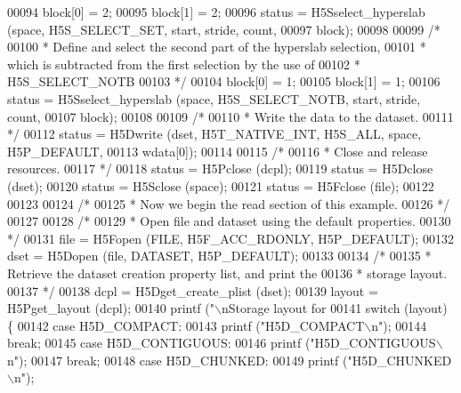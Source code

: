 \begin{DoxyCode}
{00094     block[0] = 2;
00095     block[1] = 2;
00096     status = H5Sselect\_hyperslab (space, H5S\_SELECT\_SET, start, stride, count,
00097                 block);
00098 
00099     \textcolor{comment}{/*}
00100 \textcolor{comment}{     * Define and select the second part of the hyperslab selection,}
00101 \textcolor{comment}{     * which is subtracted from the first selection by the use of}
00102 \textcolor{comment}{     * H5S\_SELECT\_NOTB}
00103 \textcolor{comment}{     */}
00104     block[0] = 1;
00105     block[1] = 1;
00106     status = H5Sselect\_hyperslab (space, H5S\_SELECT\_NOTB, start, stride, count,
00107                 block);
00108 
00109     \textcolor{comment}{/*}
00110 \textcolor{comment}{     * Write the data to the dataset.}
00111 \textcolor{comment}{     */}
00112     status = H5Dwrite (dset, H5T\_NATIVE\_INT, H5S\_ALL, space, H5P\_DEFAULT,
00113                 wdata[0]);
00114 
00115     \textcolor{comment}{/*}
00116 \textcolor{comment}{     * Close and release resources.}
00117 \textcolor{comment}{     */}
00118     status = H5Pclose (dcpl);
00119     status = H5Dclose (dset);
00120     status = H5Sclose (space);
00121     status = H5Fclose (file);
00122 
00123 
00124     \textcolor{comment}{/*}
00125 \textcolor{comment}{     * Now we begin the read section of this example.}
00126 \textcolor{comment}{     */}
00127 
00128     \textcolor{comment}{/*}
00129 \textcolor{comment}{     * Open file and dataset using the default properties.}
00130 \textcolor{comment}{     */}
00131     file = H5Fopen (FILE, H5F\_ACC\_RDONLY, H5P\_DEFAULT);
00132     dset = H5Dopen (file, DATASET, H5P\_DEFAULT);
00133 
00134     \textcolor{comment}{/*}
00135 \textcolor{comment}{     * Retrieve the dataset creation property list, and print the}
00136 \textcolor{comment}{     * storage layout.}
00137 \textcolor{comment}{     */}
00138     dcpl = H5Dget\_create\_plist (dset);
00139     layout = H5Pget\_layout (dcpl);
00140     printf (\textcolor{stringliteral}{"\(\backslash\)nStorage layout for %
00141     \textcolor{keywordflow}{switch} (layout) \{
00142         \textcolor{keywordflow}{case} H5D\_COMPACT:
00143             printf (\textcolor{stringliteral}{"H5D\_COMPACT\(\backslash\)n"});
00144             \textcolor{keywordflow}{break};
00145         \textcolor{keywordflow}{case} H5D\_CONTIGUOUS:
00146             printf (\textcolor{stringliteral}{"H5D\_CONTIGUOUS\(\backslash\)n"});
00147             \textcolor{keywordflow}{break};
00148         \textcolor{keywordflow}{case} H5D\_CHUNKED:
00149             printf (\textcolor{stringliteral}{"H5D\_CHUNKED\(\backslash\)n"});
}}
\end{DoxyCode}
